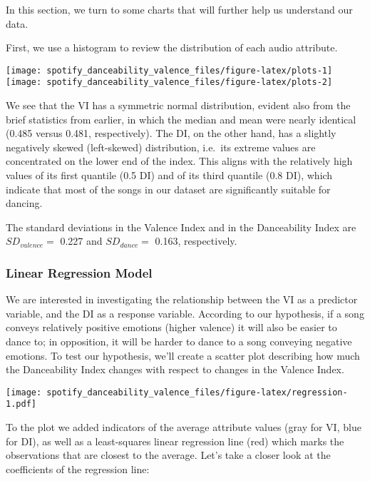 \documentclass[
]{article}
\begin{document}
In this section, we turn to some charts that will further help us
understand our data.

First, we use a histogram to review the distribution of each audio
attribute.

\texttt{[image: spotify\_danceability\_valence\_files/figure-latex/plots-1]}
\texttt{[image: spotify\_danceability\_valence\_files/figure-latex/plots-2]}

We see that the VI has a symmetric normal distribution, evident also
from the brief statistics from earlier, in which the median and mean
were nearly identical (0.485 versus 0.481, respectively). The DI, on the
other hand, has a slightly negatively skewed (left-skewed) distribution,
i.e.~its extreme values are concentrated on the lower end of the index.
This aligns with the relatively high values of its first quantile (0.5
DI) and of its third quantile (0.8 DI), which indicate that most of the
songs in our dataset are significantly suitable for dancing.

The standard deviations in the Valence Index and in the Danceability
Index are \(SD_{valence}=\) 0.227 and \(SD_{dance}=\) 0.163,
respectively.

\pagebreak

\hypertarget{linear-regression-model}{%
\subsubsection{Linear Regression Model}\label{linear-regression-model}}

We are interested in investigating the relationship between the VI as a
predictor variable, and the DI as a response variable. According to our
hypothesis, if a song conveys relatively positive emotions (higher
valence) it will also be easier to dance to; in opposition, it will be
harder to dance to a song conveying negative emotions. To test our
hypothesis, we'll create a scatter plot describing how much the
Danceability Index changes with respect to changes in the Valence Index.

\texttt{[image: spotify\_danceability\_valence\_files/figure-latex/regression-1.pdf]}

To the plot we added indicators of the average attribute values (gray
for VI, blue for DI), as well as a least-squares linear regression line
(red) which marks the observations that are closest to the average.
Let's take a closer look at the coefficients of the regression line:
\end{document}
